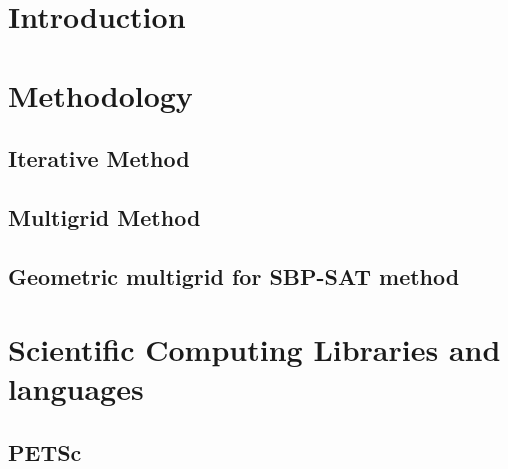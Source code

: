 \chapter{Introduction}


\chapter{Methodology}


\section{Iterative Method}

\section{Multigrid Method}

\section{Geometric multigrid for SBP-SAT method}


\chapter{Scientific Computing Libraries and languages}
\section{PETSc}

